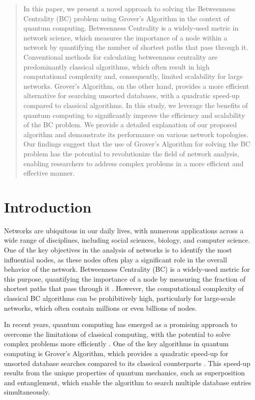 \begin{abstract}

In this paper, we present a novel approach to solving the Betweenness Centrality (BC) problem using Grover's Algorithm in the context of quantum computing. Betweenness Centrality is a widely-used metric in network science, which measures the importance of a node within a network by quantifying the number of shortest paths that pass through it. Conventional methods for calculating betweenness centrality are predominantly classical algorithms, which often result in high computational complexity and, consequently, limited scalability for large networks. Grover's Algorithm, on the other hand, provides a more efficient alternative for searching unsorted databases, with a quadratic speed-up compared to classical algorithms. In this study, we leverage the benefits of quantum computing to significantly improve the efficiency and scalability of the BC problem. We provide a detailed explanation of our proposed algorithm and demonstrate its performance on various network topologies. Our findings suggest that the use of Grover's Algorithm for solving the BC problem has the potential to revolutionize the field of network analysis, enabling researchers to address complex problems in a more efficient and effective manner.

\end{abstract}

\section{Introduction}

Networks are ubiquitous in our daily lives, with numerous applications across a wide range of disciplines, including social sciences, biology, and computer science. One of the key objectives in the analysis of networks is to identify the most influential nodes, as these nodes often play a significant role in the overall behavior of the network. Betweenness Centrality (BC) is a widely-used metric for this purpose, quantifying the importance of a node by measuring the fraction of shortest paths that pass through it \cite{Freeman1977}. However, the computational complexity of classical BC algorithms can be prohibitively high, particularly for large-scale networks, which often contain millions or even billions of nodes.

In recent years, quantum computing has emerged as a promising approach to overcome the limitations of classical computing, with the potential to solve complex problems more efficiently \cite{Nielsen2000}. One of the key algorithms in quantum computing is Grover's Algorithm, which provides a quadratic speed-up for unsorted database searches compared to its classical counterparts \cite{Grover1996}. This speed-up results from the unique properties of quantum mechanics, such as superposition and entanglement, which enable the algorithm to search multiple database entries simultaneously.

